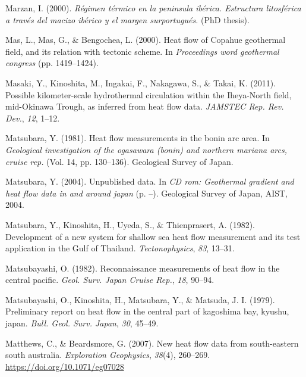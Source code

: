 \begin{CSLReferences}{1}{1}
\leavevmode{}%
Marzan, I. (2000). \emph{Régimen térmico en la peninsula ibérica. Estructura litosférica a través del macizo ibérico y el margen surportugués.} (PhD thesis).

\leavevmode{}%
Mas, L., Mas, G., \& Bengochea, L. (2000). Heat flow of {Copahue} geothermal field, and its relation with tectonic scheme. In \emph{Proceedings word geothermal congress} (pp. 1419--1424).

\leavevmode{}%
Masaki, Y., Kinoshita, M., Ingakai, F., Nakagawa, S., \& Takai, K. (2011). Possible kilometer-scale hydrothermal circulation within the {Iheya-North} field, {mid-Okinawa Trough}, as inferred from heat flow data. \emph{JAMSTEC Rep. Rev. Dev.}, \emph{12}, 1--12.

\leavevmode{}%
Matsubara, Y. (1981). Heat flow measurements in the bonin arc area. In \emph{Geological investigation of the ogasawara (bonin) and northern mariana arcs, cruise rep.} (Vol. 14, pp. 130--136). Geological Survey of Japan.

\leavevmode{}%
Matsubara, Y. (2004). Unpublished data. In \emph{CD rom: Geothermal gradient and heat flow data in and around japan} (p. --). Geological Survey of Japan, AIST, 2004.

\leavevmode{}%
Matsubara, Y., Kinoshita, H., Uyeda, S., \& Thienprasert, A. (1982). Development of a new system for shallow sea heat flow measurement and its test application in the {Gulf of Thailand}. \emph{Tectonophysics}, \emph{83}, 13--31.

\leavevmode{}%
Matsubayashi, O. (1982). Reconnaissance measurements of heat flow in the central pacific. \emph{Geol. Surv. Japan Cruise Rep.}, \emph{18}, 90--94.

\leavevmode{}%
Matsubayashi, O., Kinoshita, H., Matsubara, Y., \& Matsuda, J. I. (1979). Preliminary report on heat flow in the central part of kagoshima bay, kyushu, japan. \emph{Bull. Geol. Surv. Japan}, \emph{30}, 45--49.

\leavevmode{}%
Matthews, C., \& Beardsmore, G. (2007). New heat flow data from south-eastern south australia. \emph{Exploration Geophysics}, \emph{38}(4), 260--269. \url{https://doi.org/10.1071/eg07028}


\end{CSLReferences}
